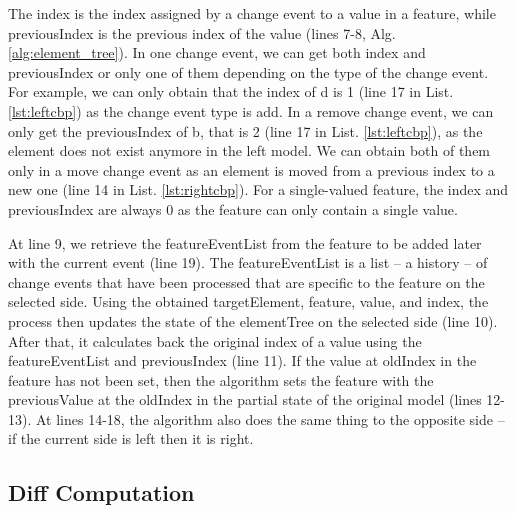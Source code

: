\documentclass{jot}
\begin{document}
    The \textsf{index} is the index assigned by a change event to a value in a feature, while \textsf{previousIndex} is the previous index of the value (lines 7-8, Alg. \ref{alg:element_tree}). In one change event, we can get both \textsf{index} and \textsf{previousIndex} or only one of them depending on the type of the change event. For example, we can only obtain that the \textsf{index} of \textsf{d} is 1 (line 17 in List. \ref{lst:leftcbp}) as the change event type is \textsf{add}. In a \textsf{remove} change event, we can only get the \textsf{previousIndex} of \textsf{b}, that is 2 (line 17 in List. \ref{lst:leftcbp}), as the element does not exist anymore in the left model. We can obtain both of them only in a \textsf{move} change event as an element is moved from a previous index to a new one (line 14 in List. \ref{lst:rightcbp}). For a single-valued feature, the \textsf{index} and \textsf{previousIndex} are always 0 as the feature can only contain a single value. 
    
    At line 9, we retrieve the \textsf{featureEventList} from the \textsf{feature} to be added later with the current \textsf{event} (line 19). The \textsf{featureEventList} is a list -- a history -- of change events that have been processed that are specific to the \textsf{feature} on the selected \textsf{side}. Using the obtained \textsf{targetElement}, \textsf{feature}, \textsf{value}, and \textsf{index}, the process then updates the state of the \textsf{elementTree} on the selected \textsf{side} (line 10). After that, it calculates back the original index of a value using the \textsf{featureEventList} and \textsf{previousIndex} (line 11). If the value at \textsf{oldIndex} in the \textsf{feature} has not been set, then the algorithm sets the \textsf{feature} with the \textsf{previousValue} at the \textsf{oldIndex} in the partial state of the original model (lines 12-13). At lines 14-18, the algorithm also does the same thing to the opposite side -- if the current \textsf{side} is \textsf{left} then it is \textsf{right}.  
    
    \subsection{Diff Computation}
    \label{sec:diff_computation}
    
\end{document}
